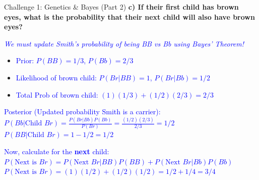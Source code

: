 \documentclass[aspectratio=169]{beamer}
\begin{document}
\begin{frame}{Challenge 1: Genetics \& Bayes (Part 2)}
    \small
    \textbf{c) If their first child has brown eyes, what is the probability that their next child will also have brown eyes?} \pause
    
    \vspace{0.2cm}
    \textcolor{blue}{\textit{We must update Smith's probability of being BB vs Bb using Bayes' Theorem!}}
    \begin{itemize}
        \item \textcolor{blue}{Prior: $P(BB) = 1/3$, $P(Bb) = 2/3$}
        \item \textcolor{blue}{Likelihood of brown child: $P(Br | BB) = 1$, $P(Br | Bb) = 1/2$}
        \item \textcolor{blue}{Total Prob of brown child: $(1)(1/3) + (1/2)(2/3) = 2/3$}
    \end{itemize}
    \pause
    \textcolor{blue}{Posterior (Updated probability Smith is a carrier):}
    \newline \textcolor{blue}{$P(Bb | \text{Child } Br) = \frac{P(Br | Bb)P(Bb)}{P(Br)} = \frac{(1/2)(2/3)}{2/3} = 1/2$}
    \newline \textcolor{blue}{$P(BB | \text{Child } Br) = 1 - 1/2 = 1/2$}
    
    \vspace{0.2cm}
    \pause
    \textcolor{blue}{Now, calculate for the \textbf{next} child:}
    \newline \textcolor{blue}{$P(\text{Next is } Br) = P(\text{Next } Br | BB)P(BB) + P(\text{Next } Br | Bb)P(Bb)$}
    \newline \textcolor{blue}{$P(\text{Next is } Br) = (1)(1/2) + (1/2)(1/2) = 1/2 + 1/4 = 3/4$}
\end{frame}
\end{document}
